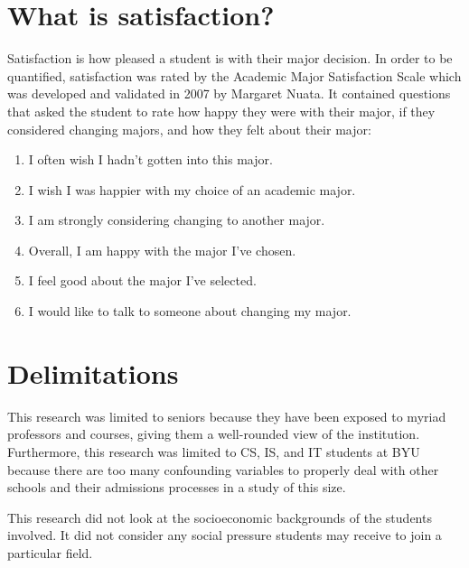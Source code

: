 \section{What is satisfaction?}
Satisfaction is how pleased a student is with their major decision. In order to be quantified, satisfaction was rated by the Academic Major Satisfaction Scale which was developed and validated in 2007 by Margaret Nuata. It contained questions that asked the student to rate how happy they were with their major, if they considered changing majors, and how they felt about their major:
\begin{enumerate}
  \item I often wish I hadn't gotten into this major.
  \item I wish I was happier with my choice of an academic major.
  \item I am strongly considering changing to another major.
  \item Overall, I am happy with the major I've chosen.
  \item I feel good about the major I've selected.
  \item I would like to talk to someone about changing my major.
\end{enumerate}

\section{Delimitations}
This research was limited to seniors because they have been exposed to myriad professors and courses, giving them a well-rounded view of the institution. Furthermore, this research was limited to CS, IS, and IT students at BYU because there are too many confounding variables to properly deal with other schools and their admissions processes in a study of this size.

This research did not look at the socioeconomic backgrounds of the students involved. It did not consider any social pressure students may receive to join a particular field.
